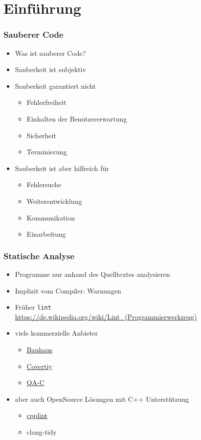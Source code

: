 \documentclass[aspectratio=169]{beamer}
\begin{document}
\section{Einführung}
\begin{frame}
  \frametitle{Sauberer Code}
  \begin{itemize}
  \item Was ist sauberer Code?
  \item Sauberkeit ist subjektiv
    \pause %
  \item Sauberkeit garantiert nicht
    \begin{itemize}
    \item Fehlerfreiheit \pause
    \item Einhalten der Benutzererwartung \pause
    \item Sicherheit \pause
    \item Terminierung
    \end{itemize}
    \pause
  \item Sauberkeit ist aber hilfreich für
    \begin{itemize}
      \pause
    \item Fehlersuche \pause
    \item Weiterentwicklung \pause
    \item Kommunikation \pause
    \item Einarbeitung
    \end{itemize}
  \end{itemize}
\end{frame}
\begin{frame}
  \frametitle{Statische Analyse}
  \begin{itemize}
  \item Programme nur anhand des Quelltextes analysieren
    \pause
  \item Implizit vom Compiler: Warnungen
    \pause %
  \item Früher \texttt{lint} \\
    \qquad \url{https://de.wikipedia.org/wiki/Lint_(Programmierwerkzeug)}
    \pause
  \item viele kommerzielle Anbieter
    \begin{itemize}
    \item \href{https://en.wikipedia.org/wiki/Bauhaus_Project_(computing)}{Bauhaus}
    \pause
    \item \href{https://en.wikipedia.org/wiki/Coverity}{Covertiy}
      \pause
    \item \href{https://en.wikipedia.org/wiki/QA-C}{QA-C}
    \end{itemize}
  \item aber auch OpenSource Lösungen mit C++ Unterstützung
    \pause
    \begin{itemize}
    \item \href{https://en.wikipedia.org/wiki/Cpplint}{cpplint}
    \pause
    \item clang-tidy
      \pause
    \end{itemize}
  \end{itemize}
\end{frame}
\end{document}
